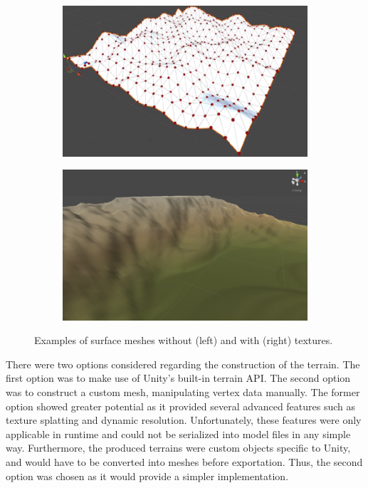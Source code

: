 \begin{figure}[h!]
  \centering
  \begin{subfigure}[b]{0.48\textwidth}
    \includegraphics[width=\textwidth]{figure/terrain_mesh.png}
  \end{subfigure}
  \quad
  \begin{subfigure}[b]{0.48\textwidth}
    \includegraphics[width=\textwidth]{figure/terrain_API.png}
  \end{subfigure}

  \caption{Examples of surface meshes without (left) and with (right) textures.}
  \label{fig:methods_terrain}
\end{figure}

There were two options considered regarding the construction of the terrain.
The first option was to make use of Unity's built-in terrain API.
The second option was to construct a custom mesh, manipulating vertex data manually.
The former option showed greater potential as it provided several advanced features such as texture splatting and dynamic resolution.
Unfortunately, these features were only applicable in runtime and could not be serialized into model files in any simple way.
Furthermore, the produced terrains were custom objects specific to Unity, and would have to be converted into meshes before exportation.
Thus, the second option was chosen as it would provide a simpler implementation.
